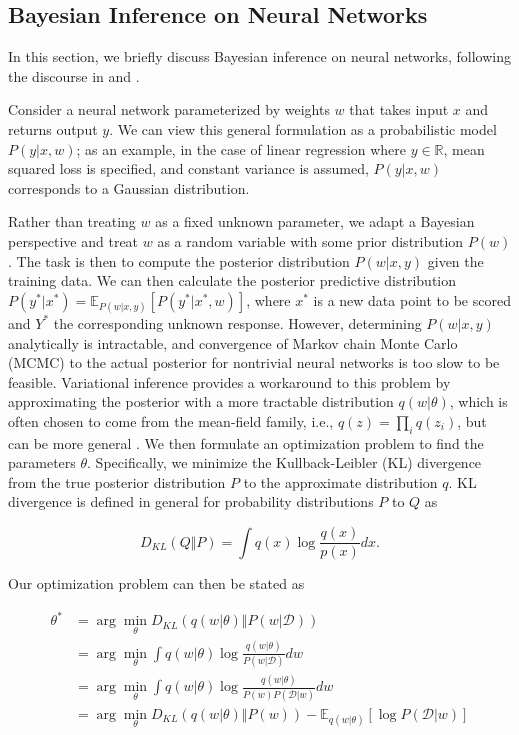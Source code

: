 \documentclass{article}
\begin{document}
\subsection{Bayesian Inference on Neural Networks} \label{section:bnn}

In this section, we briefly discuss Bayesian inference on neural networks, 
following the discourse in \cite{gravesPracticalVariational2011} and 
\cite{blundellWeightUncertainty2015}.

Consider a neural network parameterized by weights $w$ that takes input $x$ and
returns output $y$. We can view this general formulation as a probabilistic 
model $P(y|x, w)$; as an example, in the case of linear regression where $y \in
\mathbb{R}$, mean squared loss is specified, and constant variance is assumed, 
$P(y|x, w)$ corresponds to a Gaussian distribution.

Rather than treating $w$ as a fixed unknown parameter, we adapt a Bayesian
perspective and treat $w$ as a random variable with some prior distribution 
$P(w)$. The task is then to compute the posterior distribution $P(w|x, y)$ given
the training data. We can then calculate the posterior predictive distribution
$P(y^*|x^*) = \mathbb{E}_{P(w|x, y)}[P(y^*|x^*, w)]$, where $x^*$ is a new data
point to be scored and $Y^*$ the corresponding unknown response. However, 
determining $P(w|x, y)$ analytically is intractable, and convergence of Markov
chain Monte Carlo (MCMC) to the actual posterior for nontrivial neural networks 
is too slow to be feasible.
Variational inference provides a workaround to this problem by approximating the
posterior with a more tractable distribution $q(w|\theta)$, which is often 
chosen to come from the mean-field family, i.e., $q(z) = \prod_i q(z_i)$, but can
be more general \cite{blundellWeightUncertainty2015}. We then formulate an 
optimization problem to find the parameters $\theta$. Specifically, we minimize
the Kullback-Leibler (KL) divergence from the true posterior distribution $P$ to
the approximate distribution $q$. KL divergence is defined in general for 
probability distributions $P$ to $Q$ as

\begin{equation}
    D_{KL}(Q \Vert P) = \int q(x) \log \frac{q(x)}{p(x)} dx.
\end{equation}

Our optimization problem can then be stated as

\begin{align}
    \theta^* &= \arg \min_\theta D_{KL}(q(w|\theta) \Vert P(w|\mathcal{D}))\\
             &= \arg \min_\theta \int q(w|\theta) \log \frac{q(w|\theta)}{P(w|\mathcal{D})} dw\\
             &= \arg \min_\theta \int q(w|\theta) \log \frac{q(w|\theta)}{P(w)P(\mathcal{D}|w)} dw \label{eq:2}\\
             &= \arg \min_\theta D_{KL}(q(w|\theta) \Vert P(w)) - \mathbb{E}_{q(w|\theta)}[\log P(\mathcal{D}|w)] \label{eq:1}
\end{align}
\end{document}
